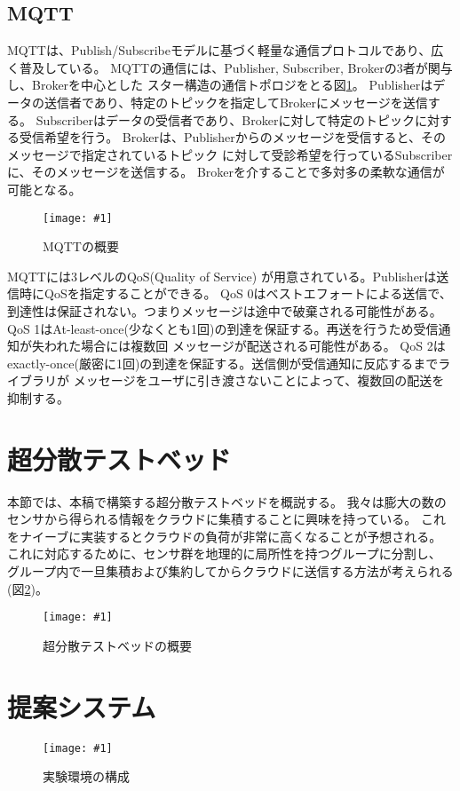 \documentclass[submit,techrep]{ipsj}
\newcommand{\reffig}[1]{図\ref{#1}}
\newcommand{\epsfig}[4]{
\begin{figure}[tb]
  \begin{center}
    \texttt{[image: \#1]}
  \end{center}
  \caption{#3}
  \label{#4}
\end{figure}}
\begin{document}
\subsection{MQTT}
MQTT\cite{MQTT}は、Publish/Subscribeモデルに基づく軽量な通信プロトコルであり、広く普及している。
MQTTの通信には、Publisher, Subscriber, Brokerの3者が関与し、Brokerを中心とした
スター構造の通信トポロジをとる\reffig{mqtt}。
Publisherはデータの送信者であり、特定のトピックを指定してBrokerにメッセージを送信する。
Subscriberはデータの受信者であり、Brokerに対して特定のトピックに対する受信希望を行う。
Brokerは、Publisherからのメッセージを受信すると、そのメッセージで指定されているトピック
に対して受診希望を行っているSubscriberに、そのメッセージを送信する。
Brokerを介することで多対多の柔軟な通信が可能となる。

\epsfig{figs/mqtt.pdf}{width=6.0cm}{MQTTの概要}{mqtt}

MQTTには3レベルのQoS(Quality of Service) が用意されている。Publisherは送信時にQoSを指定することができる。
QoS 0はベストエフォートによる送信で、到達性は保証されない。つまりメッセージは途中で破棄される可能性がある。
QoS 1はAt-least-once(少なくとも1回)の到達を保証する。再送を行うため受信通知が失われた場合には複数回
メッセージが配送される可能性がある。
QoS 2はexactly-once(厳密に1回)の到達を保証する。送信側が受信通知に反応するまでライブラリが
メッセージをユーザに引き渡さないことによって、複数回の配送を抑制する。


\section{超分散テストベッド}\label{sec:testbed}
本節では、本稿で構築する超分散テストベッドを概説する。
我々は膨大の数のセンサから得られる情報をクラウドに集積することに興味を持っている。
これをナイーブに実装するとクラウドの負荷が非常に高くなることが予想される。
これに対応するために、センサ群を地理的に局所性を持つグループに分割し、
グループ内で一旦集積および集約してからクラウドに送信する方法が考えられる(\reffig{continuum})。

\epsfig{figs/proposed.pdf}{width=8.0cm}{超分散テストベッドの概要}{continuum}


\section{提案システム}\label{sec:proposal}



\epsfig{figs/experimental-setup.pdf}{width=8.0cm}{実験環境の構成}{setup}
\end{document}
